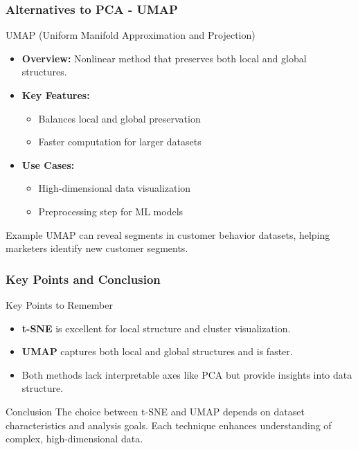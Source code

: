 \documentclass[aspectratio=169]{beamer}
\begin{document}
\begin{frame}[fragile]
    \frametitle{Alternatives to PCA - UMAP}
    \begin{block}{UMAP (Uniform Manifold Approximation and Projection)}
        \begin{itemize}
            \item \textbf{Overview:} Nonlinear method that preserves both local and global structures.
            \item \textbf{Key Features:}
                \begin{itemize}
                    \item Balances local and global preservation
                    \item Faster computation for larger datasets
                \end{itemize}
            \item \textbf{Use Cases:}
                \begin{itemize}
                    \item High-dimensional data visualization
                    \item Preprocessing step for ML models
                \end{itemize}
        \end{itemize}
    \end{block}
    
    \begin{block}{Example}
        UMAP can reveal segments in customer behavior datasets, helping marketers identify new customer segments.
    \end{block}
\end{frame}

\begin{frame}[fragile]
    \frametitle{Key Points and Conclusion}
    \begin{block}{Key Points to Remember}
        \begin{itemize}
            \item \textbf{t-SNE} is excellent for local structure and cluster visualization.
            \item \textbf{UMAP} captures both local and global structures and is faster.
            \item Both methods lack interpretable axes like PCA but provide insights into data structure.
        \end{itemize}
    \end{block}

    \begin{block}{Conclusion}
        The choice between t-SNE and UMAP depends on dataset characteristics and analysis goals. Each technique enhances understanding of complex, high-dimensional data.
    \end{block}
\end{frame}
\end{document}
